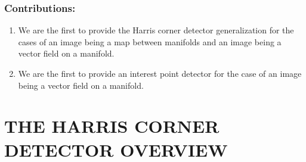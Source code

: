 \documentclass[a4paper,twoside]{article}
\begin{document}
\subsubsection*{Contributions:}
\begin{enumerate}
\item We are the first to provide the Harris corner detector generalization for the cases of an image being a map between manifolds and an image being a vector field on a manifold. 
\item We are the first to provide an interest point detector for the case of an image being a vector field on a manifold. 
\end{enumerate}

\section{\uppercase{The Harris corner detector overview}}
\end{document}
